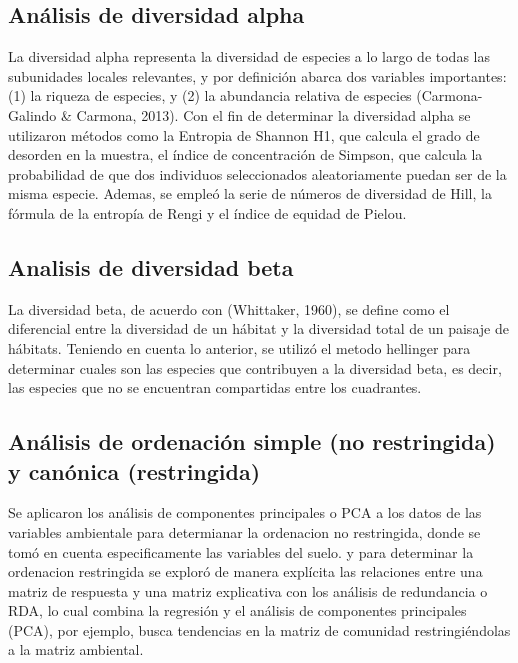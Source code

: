 \documentclass[11pt,]{article}
\begin{document}
\subsection{Análisis de diversidad
alpha}\label{anuxe1lisis-de-diversidad-alpha}

La diversidad alpha representa la diversidad de especies a lo largo de
todas las subunidades locales relevantes, y por definición abarca dos
variables importantes: (1) la riqueza de especies, y (2) la abundancia
relativa de especies (Carmona-Galindo \& Carmona, 2013). Con el fin de
determinar la diversidad alpha se utilizaron métodos como la Entropia de
Shannon H1, que calcula el grado de desorden en la muestra, el índice de
concentración de Simpson, que calcula la probabilidad de que dos
individuos seleccionados aleatoriamente puedan ser de la misma especie.
Ademas, se empleó la serie de números de diversidad de Hill, la fórmula
de la entropía de Rengi y el índice de equidad de Pielou.

\subsection{Analisis de diversidad
beta}\label{analisis-de-diversidad-beta}

La diversidad beta, de acuerdo con (Whittaker, 1960), se define como el
diferencial entre la diversidad de un hábitat y la diversidad total de
un paisaje de hábitats. Teniendo en cuenta lo anterior, se utilizó el
metodo hellinger para determinar cuales son las especies que contribuyen
a la diversidad beta, es decir, las especies que no se encuentran
compartidas entre los cuadrantes.

\subsection{Análisis de ordenación simple (no restringida) y canónica
(restringida)}\label{anuxe1lisis-de-ordenaciuxf3n-simple-no-restringida-y-canuxf3nica-restringida}

Se aplicaron los análisis de componentes principales o PCA a los datos
de las variables ambientale para determianar la ordenacion no
restringida, donde se tomó en cuenta especificamente las variables del
suelo. y para determinar la ordenacion restringida se exploró de manera
explícita las relaciones entre una matriz de respuesta y una matriz
explicativa con los análisis de redundancia o RDA, lo cual combina la
regresión y el análisis de componentes principales (PCA), por ejemplo,
busca tendencias en la matriz de comunidad restringiéndolas a la matriz
ambiental.
\end{document}
